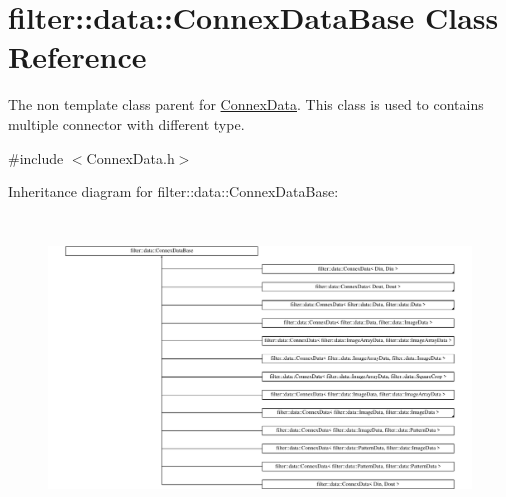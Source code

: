 \hypertarget{classfilter_1_1data_1_1_connex_data_base}{}\section{filter\+:\+:data\+:\+:Connex\+Data\+Base Class Reference}
\label{classfilter_1_1data_1_1_connex_data_base}


The non template class parent for \hyperlink{classfilter_1_1data_1_1_connex_data}{Connex\+Data}. This class is used to contains multiple connector with different type.  




{\ttfamily \#include $<$Connex\+Data.\+h$>$}

Inheritance diagram for filter\+:\+:data\+:\+:Connex\+Data\+Base\+:\begin{figure}[H]
\begin{center}
\leavevmode
\includegraphics[height=8.016359cm]{da/d49/classfilter_1_1data_1_1_connex_data_base}
\end{center}
\end{figure}

